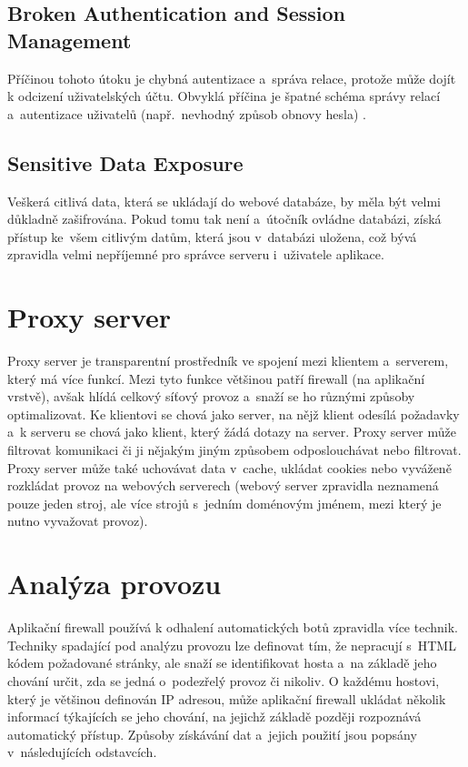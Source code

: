 \subsection*{Broken Authentication and Session Management}
Příčinou tohoto útoku je chybná autentizace a~správa relace, protože může dojít k odcizení uživatelských účtu. Obvyklá příčina je špatné schéma správy relací a~autentizace uživatelů (např.~nevhodný způsob obnovy hesla) \cite{bib:XSS_vut}.

\subsection*{Sensitive Data Exposure}
Veškerá citlivá data, která se ukládají do webové databáze, by měla být velmi důkladně zašifrována. Pokud tomu tak není a~útočník ovládne databázi, získá přístup ke~všem citlivým datům, která jsou v~databázi uložena, což bývá zpravidla velmi nepříjemné pro správce serveru i~uživatele aplikace.

\section{Proxy server}
\label{sec:proxy_server}
Proxy server je transparentní prostředník ve spojení mezi klientem a~serverem, který má více funkcí. Mezi tyto funkce většinou patří firewall (na aplikační vrstvě), avšak hlídá celkový síťový provoz a~snaží se ho různými způsoby optimalizovat. Ke klientovi se chová jako server, na nějž klient odesílá požadavky a~k serveru se chová jako klient, který žádá dotazy na server. Proxy server může filtrovat komunikaci či ji nějakým jiným způsobem odposlouchávat nebo filtrovat. Proxy server může také uchovávat data v~cache, ukládat cookies nebo vyváženě rozkládat provoz na webových serverech (webový server zpravidla neznamená pouze jeden stroj, ale více strojů s~jedním doménovým jménem, mezi který je nutno vyvažovat provoz). 

\section{Analýza provozu}
Aplikační firewall používá k odhalení automatických botů zpravidla více technik. Techniky spadající pod analýzu provozu lze definovat tím, že nepracují s~HTML kódem požadované stránky, ale snaží se identifikovat hosta a~na základě jeho chování určit, zda se jedná o~podezřelý provoz či nikoliv. O každému hostovi, který je většinou definován IP adresou, může aplikační firewall ukládat několik informací týkajících se jeho chování, na jejichž základě později rozpoznává automatický přístup. Způsoby získávání dat a~jejich použití jsou popsány v~následujících odstavcích.

